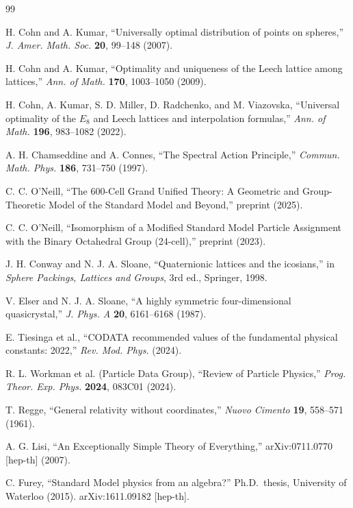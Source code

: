 \documentclass[12pt,a4paper]{article}
\theoremstyle{definition}
\begin{document}
\begin{thebibliography}{99}

H. Cohn and A. Kumar, ``Universally optimal distribution of points on spheres,'' \textit{J. Amer. Math. Soc.} \textbf{20}, 99--148 (2007).

H. Cohn and A. Kumar, ``Optimality and uniqueness of the Leech lattice among lattices,'' \textit{Ann. of Math.} \textbf{170}, 1003--1050 (2009).

H. Cohn, A. Kumar, S. D. Miller, D. Radchenko, and M. Viazovska, ``Universal optimality of the $E_8$ and Leech lattices and interpolation formulas,'' \textit{Ann. of Math.} \textbf{196}, 983--1082 (2022).

A. H. Chamseddine and A. Connes, ``The Spectral Action Principle,'' \textit{Commun. Math. Phys.} \textbf{186}, 731--750 (1997).

C. C. O'Neill, ``The 600-Cell Grand Unified Theory: A Geometric and Group-Theoretic Model of the Standard Model and Beyond,'' preprint (2025).

C. C. O'Neill, ``Isomorphism of a Modified Standard Model Particle Assignment with the Binary Octahedral Group (24-cell),'' preprint (2023).

J. H. Conway and N. J. A. Sloane, ``Quaternionic lattices and the icosians,'' in \textit{Sphere Packings, Lattices and Groups}, 3rd ed., Springer, 1998.

V. Elser and N. J. A. Sloane, ``A highly symmetric four-dimensional quasicrystal,'' \textit{J. Phys. A} \textbf{20}, 6161--6168 (1987).

E. Tiesinga et al., ``CODATA recommended values of the fundamental physical constants: 2022,'' \textit{Rev. Mod. Phys.} (2024).

R. L. Workman et al. (Particle Data Group), ``Review of Particle Physics,'' \textit{Prog. Theor. Exp. Phys.} \textbf{2024}, 083C01 (2024).

T. Regge, ``General relativity without coordinates,'' \textit{Nuovo Cimento} \textbf{19}, 558--571 (1961).

A. G. Lisi, ``An Exceptionally Simple Theory of Everything,'' arXiv:0711.0770 [hep-th] (2007).

C. Furey, ``Standard Model physics from an algebra?'' Ph.D.\ thesis, University of Waterloo (2015). arXiv:1611.09182 [hep-th].


\end{thebibliography}
\end{document}
